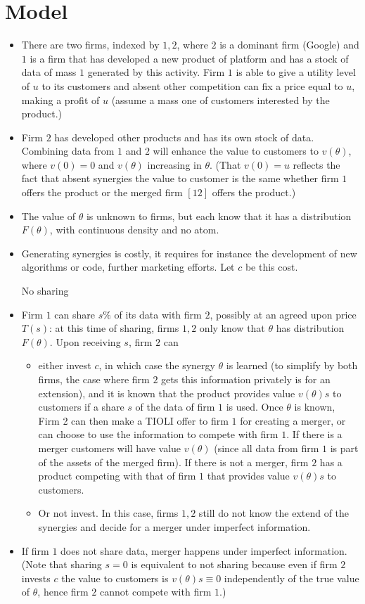 \documentclass[a4paper,leqno]{article}%
\renewcommand{\t}{\theta}
\begin{document}
\section{Model}
\begin{itemize}
    \item There are two firms, indexed by $1,2$, where $2$ is a dominant firm (Google) and $1$ is a firm that has developed a new product of platform and has a stock of data of mass $1$ generated by this activity. Firm $1$ is able to give a utility level of $u$ to its customers and absent other competition can fix a price equal to $u$, making a profit of $u$ (assume a mass one of customers interested by the product.)
    \item Firm $2$ has developed other products and has its own stock of data. Combining data from $1$ and $2$ will enhance the value to customers to $v(\t)$, where $v(0)=0$ and $v(\t)$ increasing in $\t$. (That $v(0)=u$ reflects the fact that absent synergies the value to customer is the same whether firm $1$ offers the product or the merged firm $[12]$ offers the product.)
    \item The value of $\t$ is unknown to firms, but each know that it has a distribution $F(\t)$, with continuous density and no atom.
    \item Generating synergies is costly, it requires for instance the development of new algorithms or code, further marketing efforts. Let $c$ be this cost. 
    \item [No sharing]
    \item Firm $1$ can share $s\%$ of its data with firm $2$, possibly at an agreed upon price $T(s)$: at this time of sharing, firms $1,2$ only know that $\t$ has distribution $F(\t)$. Upon receiving $s$, firm $2$ can 
    \begin{itemize}
        \item either invest $c$, in which case the synergy $\t$ is learned (to simplify by both firms, the case where firm $2$ gets this information privately is for an extension), and it is known that the product provides value $v(\t)s$ to customers if a share $s$ of the data of firm $1$ is used. Once $\t$ is known, Firm 2 can then make a TIOLI offer to firm $1$ for creating a merger, or can choose to use the information to compete with firm $1$. If there is a merger customers will have value $v(\t)$ (since all data from firm $1$ is part of the assets of the merged firm). If there is not a merger, firm $2$ has a product competing with that of firm $1$ that provides value $v(\t)s$ to customers.
        \item Or not invest. In this case, firms $1,2$ still do not know the extend of the synergies and decide for a merger under imperfect information.
    \end{itemize}
    \item If firm $1$ does not share data, merger happens under imperfect information. (Note that sharing $s=0$ is equivalent to not sharing because even if firm $2$ invests $c$ the value to customers is $v(\t)s\equiv 0$ independently of the true value of $\t$, hence firm $2$ cannot compete with firm $1$.)
\end{itemize}
\end{document}
